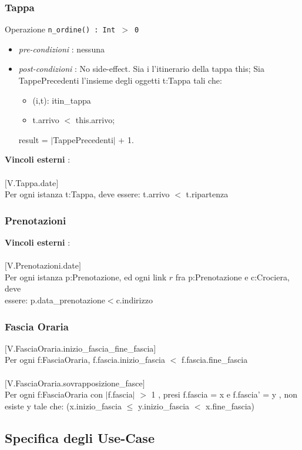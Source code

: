 \documentclass[12pt, letterpaper]{article}
\newcommand{\acc}{\\\hphantom{}\\}
\newcommand{\code}[1]{\colorbox{light-gray}{\texttt{#1}}}
\begin{document}
\subsubsection{Tappa}
Operazione \code{n\_ordine() : Int $>$ 0}\begin{itemize}
    \item \textit{pre-condizioni} : nessuna
    \item \textit{post-condizioni} : No side-effect.
          Sia i l'itinerario della tappa this;
          Sia TappePrecedenti l'insieme degli oggetti t:Tappa tali che:\begin{itemize}
              \item  (i,t): itin\_tappa\\
              \item  t.arrivo $<$ this.arrivo;\end{itemize}
          result = $|$TappePrecedenti$|$ + 1.
\end{itemize}
\textbf{Vincoli esterni} :\acc
$[$V.Tappa.date$]$\\
\hphantom{ident}Per ogni istanza t:Tappa, deve essere:
t.arrivo $<$ t.ripartenza
\subsubsection{Prenotazioni}
\textbf{Vincoli esterni} :\acc
$[$V.Prenotazioni.date$]$\\
\hphantom{ident} Per ogni istanza p:Prenotazione, ed ogni link $r$ fra p:Prenotazione e c:Crociera, deve\\
\hphantom{ident} essere:
p.data\_prenotazione$<$c.indirizzo 
\subsubsection{Fascia Oraria}
$[$V.FasciaOraria.inizio\_fascia\_fine\_fascia$]$\\
\hphantom{ident} Per ogni f:FasciaOraria, f.fascia.inizio\_fascia $<$ f.fascia.fine\_fascia\acc 
$[$V.FasciaOraria.sovrapposizione\_fasce$]$\\
\hphantom{ident} Per ogni f:FasciaOraria con  $|$f.fascia$|$ $>$ 1 , presi f.fascia = x e f.fascia' = y 
, non esiste \hphantom{ident} y tale che:
(x.inizio\_fascia $\le$ y.inizio\_fascia $<$ x.fine\_fascia)
\subsection{Specifica degli Use-Case}
\end{document}
